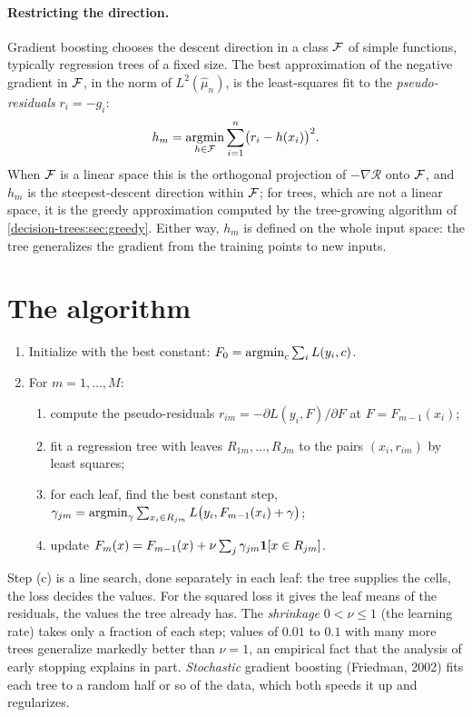 \begin{notechapter}
\paragraph{Restricting the direction.} Gradient boosting chooses the descent direction
in a class $\mathcal{F}$ of simple functions, typically regression trees of a fixed size. The best
approximation of the negative gradient in $\mathcal{F}$, in the norm of $L^2(\hat\mu_n)$, is the least-squares
fit to the \emph{pseudo-residuals} $r_i = -g_i$:
\[
  h_m = \operatorname*{argmin}_{h\in\mathcal{F}}\sum_{i=1}^n\bigl(r_i - h(x_i)\bigr)^2 .
\]
When $\mathcal{F}$ is a linear space this is the orthogonal projection of $-\nabla\mathcal R$ onto $\mathcal{F}$, and $h_m$ is the
steepest-descent direction within $\mathcal{F}$; for trees, which are not a linear space, it is the
greedy approximation computed by the tree-growing algorithm of
\cref{decision-trees:sec:greedy}. Either way, $h_m$ is defined on the whole input space: the tree
generalizes the gradient from the training points to new inputs.

\section{The algorithm}\label{gradient-boosting:sec:algorithm}

\begin{definition}\label{gradient-boosting:def:algorithm}
\begin{enumerate}[nosep]
  \item Initialize with the best constant: $F_0 = \operatorname*{argmin}_c\sum_iL(y_i, c)$.
  \item For $m = 1,\dots,M$:
  \begin{enumerate}[nosep]
    \item compute the pseudo-residuals $r_{im} = -\partial L(y_i, F)/\partial F$ at $F = F_{m-1}(x_i)$;
    \item fit a regression tree with leaves $R_{1m},\dots,R_{Jm}$ to the pairs $(x_i, r_{im})$ by least squares;
    \item for each leaf, find the best constant step,
          $\gamma_{jm} = \operatorname*{argmin}_\gamma\sum_{x_i\in R_{jm}}L\bigl(y_i, F_{m-1}(x_i) + \gamma\bigr)$;
    \item update $F_m(x) = F_{m-1}(x) + \nu\sum_j\gamma_{jm}\mathbf{1}[x\in R_{jm}]$.
  \end{enumerate}
\end{enumerate}
\end{definition}

Step (c) is a line search, done separately in each leaf: the tree supplies the cells, the
loss decides the values. For the squared loss it gives the leaf means of the residuals,
the values the tree already has. The \emph{shrinkage} $0<\nu\leq1$ (the learning rate) takes only a
fraction of each step; values of $0.01$ to $0.1$ with many more trees generalize markedly
better than $\nu = 1$, an empirical fact that the analysis of early stopping explains in
part. \emph{Stochastic} gradient boosting (Friedman, 2002) fits each tree to a random half
or so of the data, which both speeds it up and regularizes.


\end{notechapter}
